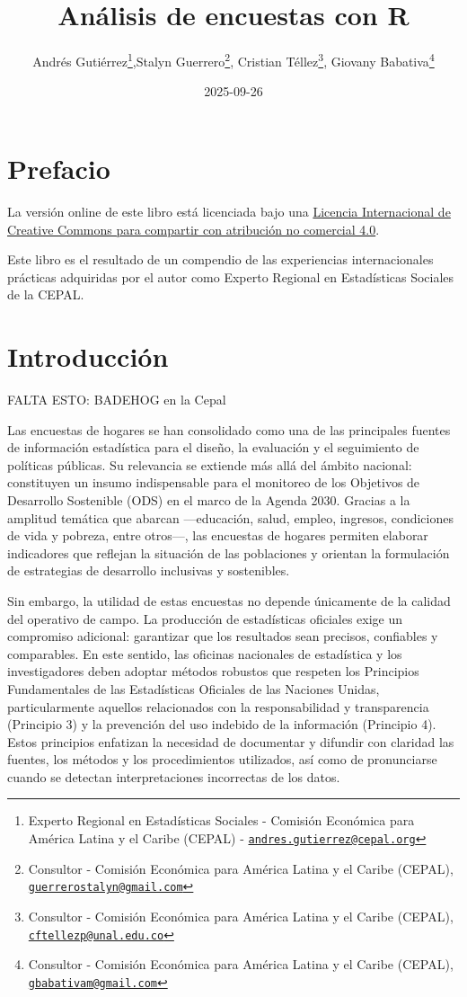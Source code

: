 \documentclass[
  12pt,
]{book}
\title{Análisis de encuestas con R}
\author{Andrés Gutiérrez\footnote{Experto Regional en Estadísticas Sociales - Comisión Económica para América Latina y el Caribe (CEPAL) - \href{mailto:andres.gutierrez@cepal.org}{\nolinkurl{andres.gutierrez@cepal.org}}},Stalyn Guerrero\footnote{Consultor - Comisión Económica para América Latina y el Caribe (CEPAL), \href{mailto:guerrerostalyn@gmail.com}{\nolinkurl{guerrerostalyn@gmail.com}}}, Cristian Téllez\footnote{Consultor - Comisión Económica para América Latina y el Caribe (CEPAL), \href{mailto:cftellezp@unal.edu.co}{\nolinkurl{cftellezp@unal.edu.co}}}, Giovany Babativa\footnote{Consultor - Comisión Económica para América Latina y el Caribe (CEPAL), \href{mailto:gbabativam@gmail.com}{\nolinkurl{gbabativam@gmail.com}}}}
\date{2025-09-26}
\begin{document}
\maketitle

{
\hypersetup{linkcolor=}
\setcounter{tocdepth}{1}
\tableofcontents
}
\listoffigures
\listoftables
\chapter*{Prefacio}\label{prefacio}

La versión online de este libro está licenciada bajo una \href{http://creativecommons.org/licenses/by-nc-sa/4.0/}{Licencia Internacional de Creative Commons para compartir con atribución no comercial 4.0}.

Este libro es el resultado de un compendio de las experiencias internacionales prácticas adquiridas por el autor como Experto Regional en Estadísticas Sociales de la CEPAL.

\chapter{Introducción}\label{introducciuxf3n}

FALTA ESTO: BADEHOG en la Cepal

Las encuestas de hogares se han consolidado como una de las principales fuentes de información estadística para el diseño, la evaluación y el seguimiento de políticas públicas. Su relevancia se extiende más allá del ámbito nacional: constituyen un insumo indispensable para el monitoreo de los Objetivos de Desarrollo Sostenible (ODS) en el marco de la Agenda 2030. Gracias a la amplitud temática que abarcan ---educación, salud, empleo, ingresos, condiciones de vida y pobreza, entre otros---, las encuestas de hogares permiten elaborar indicadores que reflejan la situación de las poblaciones y orientan la formulación de estrategias de desarrollo inclusivas y sostenibles.

Sin embargo, la utilidad de estas encuestas no depende únicamente de la calidad del operativo de campo. La producción de estadísticas oficiales exige un compromiso adicional: garantizar que los resultados sean precisos, confiables y comparables. En este sentido, las oficinas nacionales de estadística y los investigadores deben adoptar métodos robustos que respeten los Principios Fundamentales de las Estadísticas Oficiales de las Naciones Unidas, particularmente aquellos relacionados con la responsabilidad y transparencia (Principio 3) y la prevención del uso indebido de la información (Principio 4). Estos principios enfatizan la necesidad de documentar y difundir con claridad las fuentes, los métodos y los procedimientos utilizados, así como de pronunciarse cuando se detectan interpretaciones incorrectas de los datos.
\end{document}
